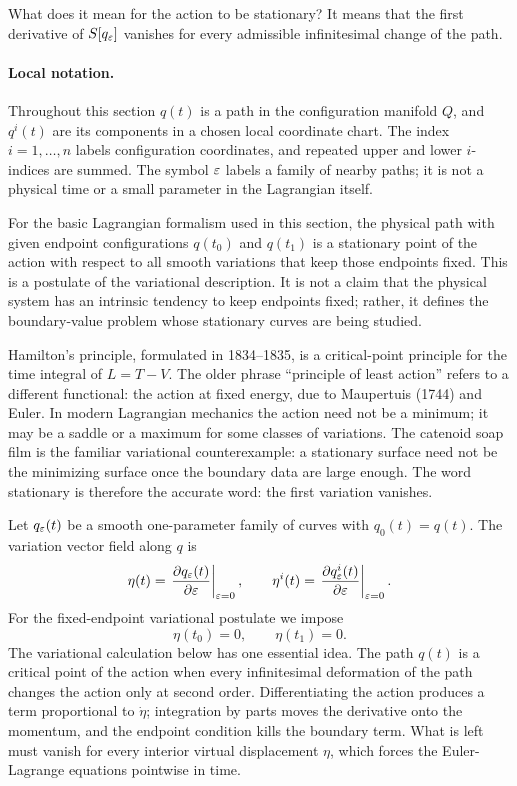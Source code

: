 What does it mean for the action to be stationary? It means that the first
derivative of \(S[q_\varepsilon]\) vanishes for every admissible infinitesimal change
of the path.

\paragraph{Local notation.}
Throughout this section \(q(t)\) is a path in the configuration manifold \(Q\),
and \(q^i(t)\) are its components in a chosen local coordinate chart.  The
index \(i=1,\ldots,n\) labels configuration coordinates, and repeated upper and
lower \(i\)-indices are summed.  The symbol \(\varepsilon\) labels a family of nearby
paths; it is not a physical time or a small parameter in the Lagrangian itself.

\begin{postulate}
For the basic Lagrangian formalism used in this section, the physical path with
given endpoint configurations \(q(t_0)\) and \(q(t_1)\) is a stationary point
of the action with respect to all smooth variations that keep those endpoints
fixed.  This is a postulate of the variational description.  It is not a
claim that the physical system has an intrinsic tendency to keep endpoints
fixed; rather, it defines the boundary-value problem whose stationary curves
are being studied.
\end{postulate}

\begin{remark}
Hamilton's principle, formulated in 1834--1835, is a critical-point principle
for the time integral of \(L=T-V\). The older phrase ``principle of least
action'' refers to a different functional: the action at fixed energy, due to
Maupertuis (1744) and Euler. In modern Lagrangian mechanics the action need not
be a minimum; it may be a saddle or a maximum for some classes of variations.
The catenoid soap film is the familiar variational counterexample: a stationary
surface need not be the minimizing surface once the boundary data are large
enough. The word stationary is therefore the accurate word: the first variation
vanishes.
\end{remark}

Let \(q_\varepsilon(t)\) be a smooth one-parameter family of curves with
\(q_0(t)=q(t)\). The variation vector field along \(q\) is
\[
  \eta(t)=\left.\frac{\partial q_\varepsilon(t)}{\partial \varepsilon}\right|_{\varepsilon=0},
  \qquad
  \eta^i(t)=\left.\frac{\partial q_\varepsilon^i(t)}{\partial \varepsilon}\right|_{\varepsilon=0}.
\]
For the fixed-endpoint variational postulate we impose
\[
  \eta(t_0)=0,\qquad \eta(t_1)=0.
\]
The variational calculation below has one essential idea. The path \(q(t)\) is
a critical point of the action when every infinitesimal deformation of the path
changes the action only at second order. Differentiating the action produces a
term proportional to \(\dot\eta\); integration by parts moves the derivative
onto the momentum, and the endpoint condition kills the boundary term. What is
left must vanish for every interior virtual displacement \(\eta\), which forces
the Euler-Lagrange equations pointwise in time.

